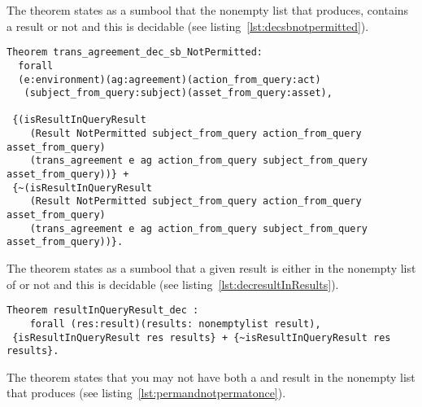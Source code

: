 The theorem  states as a sumbool that the nonempty list that  produces, contains a  result or not and this is decidable (see listing~\ref{lst:decsbnotpermitted}).

\begin{lstlisting}
Theorem trans_agreement_dec_sb_NotPermitted:
  forall
  (e:environment)(ag:agreement)(action_from_query:act)
   (subject_from_query:subject)(asset_from_query:asset),

 {(isResultInQueryResult 
    (Result NotPermitted subject_from_query action_from_query asset_from_query)
    (trans_agreement e ag action_from_query subject_from_query asset_from_query))} +
 {~(isResultInQueryResult 
    (Result NotPermitted subject_from_query action_from_query asset_from_query)
    (trans_agreement e ag action_from_query subject_from_query asset_from_query))}.

\end{lstlisting}

The theorem  states as a sumbool that a given result is either in the nonempty list of  or not and this is decidable (see listing~\ref{lst:decresultInResults}).

\begin{lstlisting}
Theorem resultInQueryResult_dec :
    forall (res:result)(results: nonemptylist result), 
 {isResultInQueryResult res results} + {~isResultInQueryResult res results}.
\end{lstlisting}

The theorem  states that you may not have both a  and  result in the nonempty list that  produces (see listing~\ref{lst:permandnotpermatonce}).

